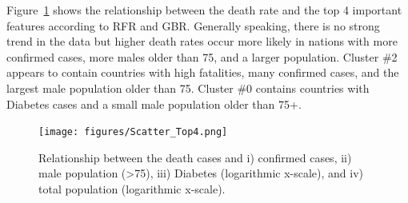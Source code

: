 \documentclass[a4paper, 11pt]{article} %
\begin{document}
Figure~\ref{fig:Scatter} shows the relationship between the death rate and the top 4 important features according to RFR and GBR. Generally speaking, there is no strong trend in the data but higher death rates occur more likely in nations with more confirmed cases, more males older than 75, and a larger population. Cluster \#2 appears to contain countries with high fatalities, many confirmed cases, and the largest male population older than 75. Cluster \#0 contains countries with Diabetes cases and a small male population older than 75+.

\begin{figure}[htbp]
   \texttt{[image: figures/Scatter\_Top4.png]} 
   \caption{Relationship between the death cases and i) confirmed cases, ii) male population (>75), iii) Diabetes (logarithmic x-scale), and iv) total population (logarithmic x-scale).}
   \label{fig:Scatter}
\end{figure}
\end{document}
